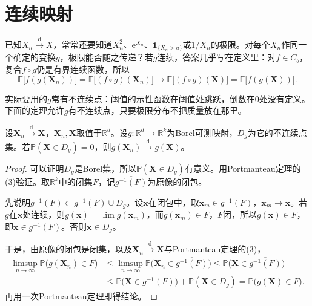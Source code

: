 \section{连续映射}
\label{sec:weak-continuous-mapping}

已知$X_n\xrightarrow{\mathrm{d}}X$，常常还要知道$X_n^{2}$、$\mathrm{e}^{X_n}$、$\mathbf{1}_{\{X_n>a\}}$或$1/X_n$的极限。对每个$X_n$作同一个确定的变换$g$，极限能否随之传递？若$g$连续，答案几乎写在定义里：对$f\in C_b$，复合$f\circ g$仍是有界连续函数，所以
\[
 \mathbb{E}\bigl[f(g(\bm{X}_n))\bigr]=\mathbb{E}\bigl[(f\circ g)(\bm{X}_n)\bigr]\longrightarrow\mathbb{E}\bigl[(f\circ g)(\bm{X})\bigr]=\mathbb{E}\bigl[f(g(\bm{X}))\bigr] .
\]

实际要用的$g$常有不连续点：阈值的示性函数在阈值处跳跃，倒数在$0$处没有定义。下面的定理允许$g$有不连续点，只要极限分布不把质量放在那里。

\begin{theorem}[连续映射定理]
\label{thm:weak-continuous-mapping}
设$\bm{X}_n\xrightarrow{\mathrm{d}}\bm{X}$，$\bm{X}_n,\bm{X}$取值于$\mathbb{R}^{d}$。设$g:\mathbb{R}^{d}\to\mathbb{R}^{k}$为Borel可测映射，$D_g$为它的不连续点集。若$\mathbb{P}(\bm{X}\in D_g)=0$，则$g(\bm{X}_n)\xrightarrow{\mathrm{d}}g(\bm{X})$。
\end{theorem}

\begin{proof}
可以证明$D_g$是Borel集，所以$\mathbb{P}(\bm{X}\in D_g)$有意义。用Portmanteau定理的(3)验证。取$\mathbb{R}^{k}$中的闭集$F$，记$\overline{g^{-1}(F)}$为原像的闭包。

先说明$\overline{g^{-1}(F)}\subset g^{-1}(F)\cup D_g$。设$\bm{x}$在闭包中，取$\bm{x}_m\in g^{-1}(F)$，$\bm{x}_m\to\bm{x}$。若$g$在$\bm{x}$处连续，则$g(\bm{x})=\lim g(\bm{x}_m)$，而$g(\bm{x}_m)\in F$，$F$闭，所以$g(\bm{x})\in F$，即$\bm{x}\in g^{-1}(F)$。否则$\bm{x}\in D_g$。

于是，由原像的闭包是闭集，以及$\bm{X}_n\xrightarrow{\mathrm{d}}\bm{X}$与Portmanteau定理的(3)，
\[
 \begin{aligned}
 \limsup_{n\to\infty}\mathbb{P}\bigl(g(\bm{X}_n)\in F\bigr)
 &\leq\limsup_{n\to\infty}\mathbb{P}\bigl(\bm{X}_n\in\overline{g^{-1}(F)}\bigr)
 \leq\mathbb{P}\bigl(\bm{X}\in\overline{g^{-1}(F)}\bigr)\\
 &\leq\mathbb{P}\bigl(\bm{X}\in g^{-1}(F)\bigr)+\mathbb{P}(\bm{X}\in D_g)=\mathbb{P}\bigl(g(\bm{X})\in F\bigr) .
 \end{aligned}
\]
再用一次Portmanteau定理即得结论。
\end{proof}

